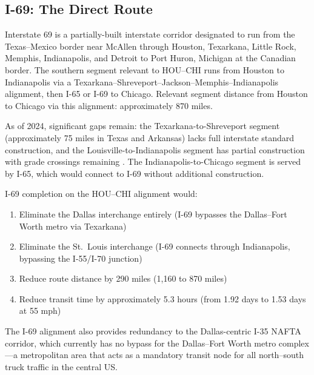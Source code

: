 \subsection{I-69: The Direct Route}

Interstate 69 is a partially-built interstate corridor designated to run from the Texas--Mexico border near McAllen through Houston, Texarkana, Little Rock, Memphis, Indianapolis, and Detroit to Port Huron, Michigan at the Canadian border. The southern segment relevant to HOU--CHI runs from Houston to Indianapolis via a Texarkana--Shreveport--Jackson--Memphis--Indianapolis alignment, then I-65 or I-69 to Chicago. Relevant segment distance from Houston to Chicago via this alignment: approximately 870 miles.

As of 2024, significant gaps remain: the Texarkana-to-Shreveport segment (approximately 75 miles in Texas and Arkansas) lacks full interstate standard construction, and the Louisville-to-Indianapolis segment has partial construction with grade crossings remaining \citep{FHWA_freight2023}. The Indianapolis-to-Chicago segment is served by I-65, which would connect to I-69 without additional construction.

I-69 completion on the HOU--CHI alignment would:
\begin{enumerate}
  \item Eliminate the Dallas interchange entirely (I-69 bypasses the Dallas--Fort Worth metro via Texarkana)
  \item Eliminate the St.\ Louis interchange (I-69 connects through Indianapolis, bypassing the I-55/I-70 junction)
  \item Reduce route distance by 290 miles (1,160 to 870 miles)
  \item Reduce transit time by approximately 5.3 hours (from 1.92 days to 1.53 days at 55 mph)
\end{enumerate}

The I-69 alignment also provides redundancy to the Dallas-centric I-35 NAFTA corridor, which currently has no bypass for the Dallas--Fort Worth metro complex---a metropolitan area that acts as a mandatory transit node for all north--south truck traffic in the central US.
